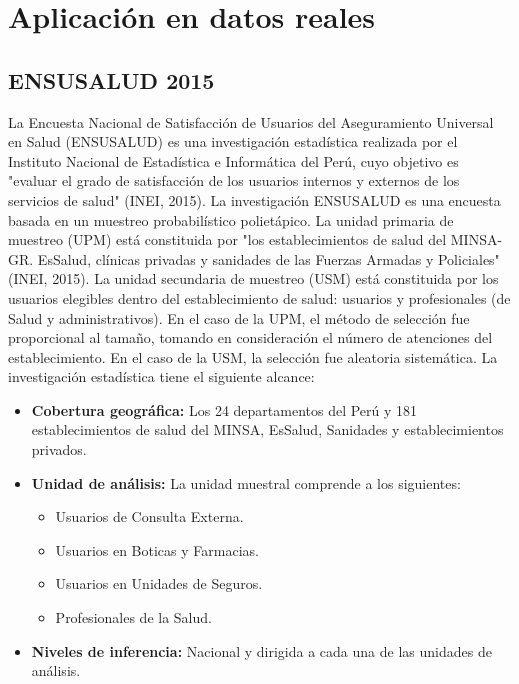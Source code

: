 \chapter{Aplicación en datos reales}

\section{ENSUSALUD 2015}
La Encuesta Nacional de Satisfacción de Usuarios del Aseguramiento Universal en Salud (ENSUSALUD) es una investigación estadística realizada por el Instituto Nacional de Estadística e Informática del Perú, cuyo objetivo es "evaluar el grado de satisfacción de los usuarios internos y externos de los servicios de salud" (INEI, 2015). La investigación ENSUSALUD es una encuesta basada en un muestreo probabilístico polietápico. La unidad primaria de muestreo (UPM) está constituida por "los establecimientos de salud del MINSA-GR. EsSalud, clínicas privadas y sanidades de las Fuerzas Armadas y Policiales" (INEI, 2015). La unidad secundaria de muestreo (USM) está constituida por los usuarios elegibles dentro del establecimiento de salud: usuarios y profesionales (de Salud y administrativos). En el caso de la UPM, el método de selección fue proporcional al tamaño, tomando en consideración el número de atenciones del establecimiento. En el caso de la USM, la selección fue aleatoria sistemática. La investigación estadística tiene el siguiente alcance:
\begin{itemize}
	\item \textbf{Cobertura geográfica:} Los 24 departamentos del Perú y 181 establecimientos de salud del MINSA, EsSalud, Sanidades y establecimientos privados.
	\item \textbf{Unidad de análisis:} La unidad muestral comprende a los siguientes:
		\begin{itemize}
			\item Usuarios de Consulta Externa.
			\item Usuarios en Boticas y Farmacias.
			\item Usuarios en Unidades de Seguros.
			\item Profesionales de la Salud.
		\end{itemize}
	\item \textbf{Niveles de inferencia:} Nacional y dirigida a cada una de las unidades de análisis.
\end{itemize}
